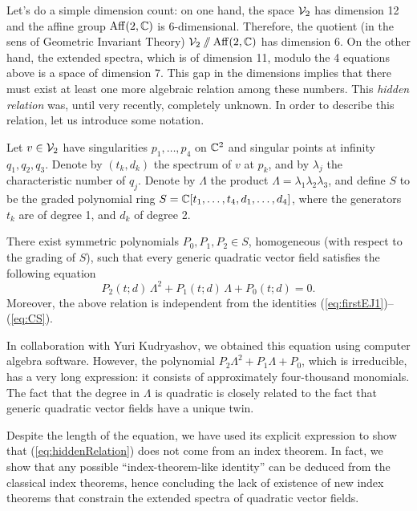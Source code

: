 \documentclass[phd,tocprelim]{cornell}
\begin{document}
Let's do a simple dimension count: on one hand, the space $\mathcal{V}_2$ has dimension 12 and the affine group $\operatorname{Aff}({2},{\mathbb{C}})$ is 6-dimensional. Therefore, the quotient (in the sens of Geometric Invariant Theory) $\mathcal{V}_2\sslash\operatorname{Aff}({2},{\mathbb{C}})$ has dimension 6. On the other hand, the extended spectra, which is of dimension 11, modulo the 4 equations above is a space of dimension 7. This gap in the dimensions implies that there must exist at least one more algebraic relation among these numbers. This \textit{hidden relation} was, until very recently, completely unknown. In order to describe this relation, let us introduce some notation.

Let $v\in\mathcal{V}_2$ have singularities $p_1,\ldots,p_4$ on $\mathbb{C}^2$ and singular points at infinity $q_1,q_2,q_3$. Denote by $(t_k,d_k)$ the spectrum of $v$ at $p_k$, and by $\lambda_j$ the characteristic number of $q_j$. Denote by $\Lambda$ the product $\Lambda=\lambda_1\lambda_2\lambda_3$, and define $S$ to be the graded polynomial ring $S=\mathbb{C}[t_1,\ldots,t_4,d_1,\ldots,d_4]$, where the generators $t_k$ are of degree 1, and $d_k$ of degree 2.

\begin{theorem}\label{thm:hiddenRelation}
 There exist symmetric polynomials $P_0,P_1,P_2\in S$, homogeneous (with respect to the grading of $S$), such that every generic quadratic vector field satisfies the following equation
  \begin{equation}\label{eq:hiddenRelation}
   P_2(t;d)\,\Lambda^2+P_1(t;d)\,\Lambda+P_0(t;d)=0 .
  \end{equation}
 Moreover, the above relation is independent from the identities (\ref{eq:firstEJ1})--(\ref{eq:CS}).
\end{theorem}

In collaboration with Yuri Kudryashov, we obtained this equation using computer algebra software. However, the polynomial $P_2\Lambda^2+P_1\Lambda+P_0$, which is irreducible, has a very long expression: it consists of approximately four-thousand monomials. The fact that the degree in $\Lambda$ is quadratic is closely related to the fact that generic quadratic vector fields have a unique twin. 

Despite the length of the equation, we have used its explicit expression to show that (\ref{eq:hiddenRelation}) does not come from an index theorem. In fact, we show that any possible ``index-theorem-like identity'' can be deduced from the classical index theorems, hence concluding the lack of existence of new index theorems that constrain the extended spectra of quadratic vector fields.
\end{document}

